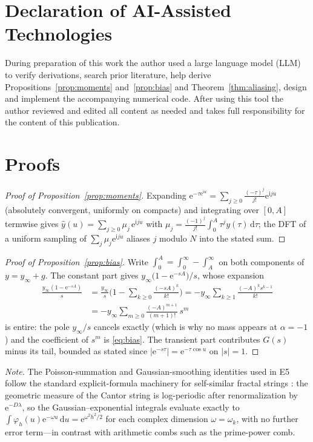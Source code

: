 \documentclass[11pt, a4paper]{article}
\theoremstyle{definition}
\theoremstyle{remark}
\newcommand{\dd}{\,\mathrm{d}}
\newcommand{\ii}{\mathrm{i}}
\newcommand{\ee}{\mathrm{e}}
\begin{document}
\section*{Declaration of AI-Assisted Technologies}

During preparation of this work the author used a large language model
(LLM) to verify derivations, search prior literature, help derive
Propositions~\ref{prop:moments} and~\ref{prop:bias} and
Theorem~\ref{thm:aliasing}, design and implement the accompanying numerical
code. After using this tool the
author reviewed and edited all content as
needed and takes full responsibility for the content of this publication.

\appendix
\section{Proofs}\label{app:proofs}

\begin{proof}[Proof of Proposition~\ref{prop:moments}]
Expanding $\ee^{-\tau\ee^{\ii u}}=\sum_{j\ge0}\frac{(-\tau)^{j}}{j!}
\ee^{\ii ju}$ (absolutely convergent, uniformly on compacts) and
integrating over $[0,A]$ termwise gives
$\widehat{y}(u)=\sum_{j\ge0}\mu_j\,\ee^{\ii ju}$ with
$\mu_j=\frac{(-1)^{j}}{j!}\int_0^{A}\tau^{j}y(\tau) \dd\tau$; the DFT of a
uniform sampling of $\sum_j\mu_j\ee^{\ii ju}$ aliases $j$ modulo $N$ into
the stated sum.
\end{proof}

\begin{proof}[Proof of Proposition~\ref{prop:bias}]
Write $\int_0^{A}=\int_0^{\infty}-\int_A^{\infty}$ on both components of
$y=y_\infty+g$. The constant part gives
$y_\infty\big(1-\ee^{-sA}\big)/s$, whose expansion
\begin{align*}
\frac{y_\infty(1-\ee^{-sA})}{s}
&=\frac{y_\infty}{s}\Big(1-\sum_{k\ge0}\frac{(-sA)^{k}}{k!} \Big)
=-y_\infty\sum_{k\ge1}\frac{(-A)^{k}s^{k-1}}{k!} \\
&=-y_\infty\sum_{m\ge0}\frac{(-A)^{m+1}}{(m+1)!}\,s^{m}
\end{align*}
is entire: the pole $y_\infty/s$ cancels exactly (which is why no mass
appears at $\alpha=-1$) and the coefficient of $s^{m}$ is
\eqref{eq:bias}. The transient part contributes $G(s)$ minus its tail,
bounded as stated since $|\ee^{-s\tau}|=\ee^{-\tau\cos u}$ on $|s|=1$.
\end{proof}

\emph{Note.} The Poisson-summation and Gaussian-smoothing identities used
in E5 follow the standard explicit-formula machinery for self-similar
fractal strings \cite{LapidusVanFrankenhuijsen2013}: the geometric measure
of the Cantor string is log-periodic after renormalization by
$\ee^{-D\lambda}$, so the Gaussian--exponential integrals evaluate exactly
to
$\int \varphi_h(u)\ee^{-\omega u}\dd u = \ee^{\omega^{2}h^{2}/2}$ for each
complex dimension $\omega=\omega_k$, with no further error term---in
contrast with arithmetic combs such as the prime-power comb.
\end{document}
